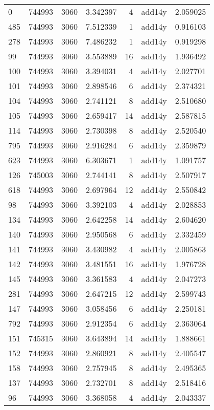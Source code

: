 \begin{tabular}{lrrrrlr}
0 & 744993 & 3060 & 3.342397 & 4 & add14y & 2.059025 \\
485 & 744993 & 3060 & 7.512339 & 1 & add14y & 0.916103 \\
278 & 744993 & 3060 & 7.486232 & 1 & add14y & 0.919298 \\
99 & 744993 & 3060 & 3.553889 & 16 & add14y & 1.936492 \\
100 & 744993 & 3060 & 3.394031 & 4 & add14y & 2.027701 \\
101 & 744993 & 3060 & 2.898546 & 6 & add14y & 2.374321 \\
104 & 744993 & 3060 & 2.741121 & 8 & add14y & 2.510680 \\
105 & 744993 & 3060 & 2.659417 & 14 & add14y & 2.587815 \\
114 & 744993 & 3060 & 2.730398 & 8 & add14y & 2.520540 \\
795 & 744993 & 3060 & 2.916284 & 6 & add14y & 2.359879 \\
623 & 744993 & 3060 & 6.303671 & 1 & add14y & 1.091757 \\
126 & 745003 & 3060 & 2.744141 & 8 & add14y & 2.507917 \\
618 & 744993 & 3060 & 2.697964 & 12 & add14y & 2.550842 \\
98 & 744993 & 3060 & 3.392103 & 4 & add14y & 2.028853 \\
134 & 744993 & 3060 & 2.642258 & 14 & add14y & 2.604620 \\
140 & 744993 & 3060 & 2.950568 & 6 & add14y & 2.332459 \\
141 & 744993 & 3060 & 3.430982 & 4 & add14y & 2.005863 \\
142 & 744993 & 3060 & 3.481551 & 16 & add14y & 1.976728 \\
145 & 744993 & 3060 & 3.361583 & 4 & add14y & 2.047273 \\
281 & 744993 & 3060 & 2.647215 & 12 & add14y & 2.599743 \\
147 & 744993 & 3060 & 3.058456 & 6 & add14y & 2.250181 \\
792 & 744993 & 3060 & 2.912354 & 6 & add14y & 2.363064 \\
151 & 745315 & 3060 & 3.643894 & 14 & add14y & 1.888661 \\
152 & 744993 & 3060 & 2.860921 & 8 & add14y & 2.405547 \\
158 & 744993 & 3060 & 2.757945 & 8 & add14y & 2.495365 \\
137 & 744993 & 3060 & 2.732701 & 8 & add14y & 2.518416 \\
96 & 744993 & 3060 & 3.368058 & 4 & add14y & 2.043337 \\

\end{tabular}
